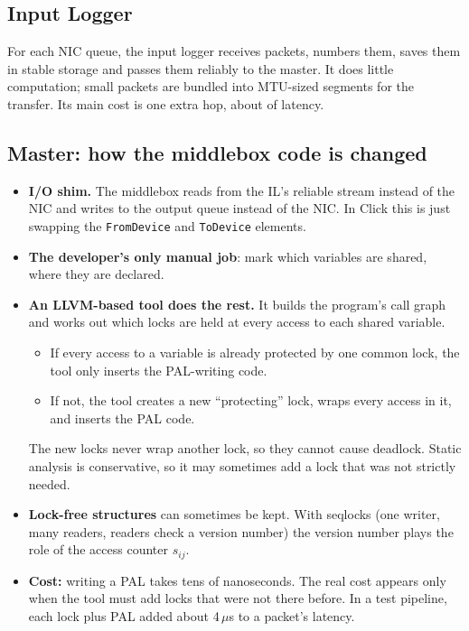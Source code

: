 \subsection{Input Logger}
For each NIC queue, the input logger receives packets, numbers them, saves them in stable storage and passes them reliably to the master.
It does little computation; small packets are bundled into MTU-sized segments for the transfer. Its main cost is one extra hop,
about  of latency.

\subsection{Master: how the middlebox code is changed}
\begin{itemize}
  \item \textbf{I/O shim.} The middlebox reads from the IL's reliable stream instead of the NIC and writes to the output queue instead of the
        NIC. In Click this is just swapping the \texttt{FromDevice} and \texttt{ToDevice} elements.
  \item \textbf{The developer's only manual job}: mark which variables are shared, where they are declared.
  \item \textbf{An LLVM-based tool does the rest.} It builds the program's call graph and works out which locks are held at every access to each
        shared variable.
        \begin{itemize}
          \item If every access to a variable is already protected by one common lock, the tool only inserts the PAL-writing code.
          \item If not, the tool creates a new ``protecting'' lock, wraps every access in it, and inserts the PAL code.
        \end{itemize}
        The new locks never wrap another lock, so they cannot cause deadlock. Static analysis is conservative, so it may sometimes add a lock that
        was not strictly needed.
  \item \textbf{Lock-free structures} can sometimes be kept. With seqlocks (one writer, many readers, readers check a version number) the
        version number plays the role of the access counter $s_{ij}$.
  \item \textbf{Cost:} writing a PAL takes tens of nanoseconds. The real cost appears only when the tool must add locks that were not there
        before. In a test pipeline, each lock plus PAL added about 4\,$\mu$s to a packet's latency.
\end{itemize}

